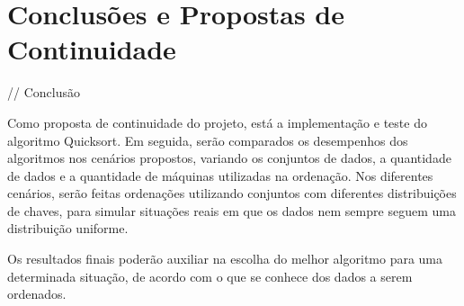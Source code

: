 \chapter{Conclusões e Propostas de Continuidade}
\label{cap:conclusao}


// Conclusão

Como proposta de continuidade do projeto, está a implementação e teste do algoritmo Quicksort. 
Em seguida, serão comparados os desempenhos dos algoritmos nos cenários propostos, variando os conjuntos de dados,  a quantidade
de dados e a quantidade de máquinas utilizadas na ordenação. Nos diferentes cenários, serão feitas ordenações utilizando conjuntos com diferentes distribuições de chaves,
para simular situações reais em que os dados nem sempre seguem uma distribuição uniforme.

Os resultados finais poderão auxiliar na escolha do melhor algoritmo para uma determinada situação, de acordo com o que se conhece dos dados a serem ordenados.  